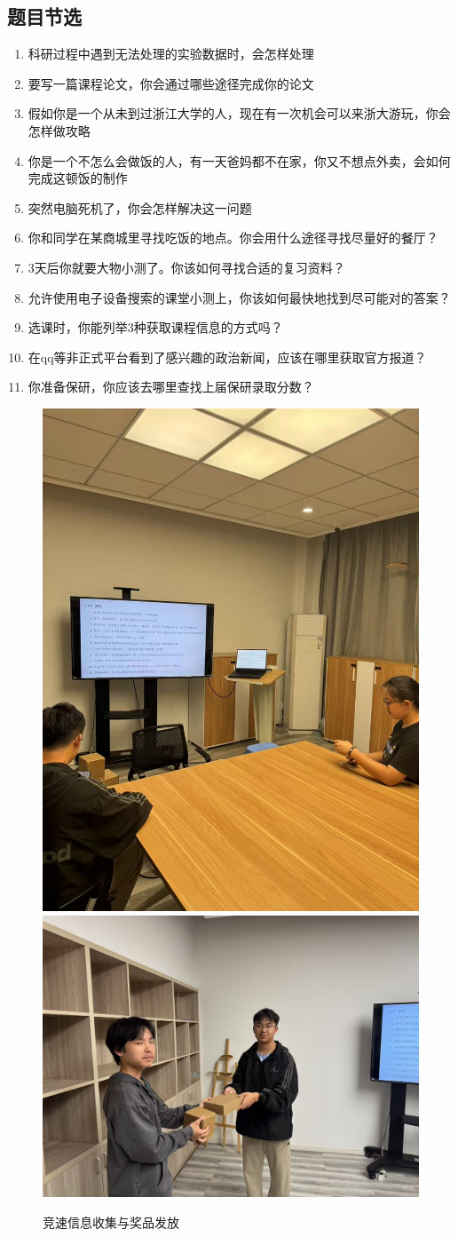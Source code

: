 \subsection{题目节选}
\begin{enumerate}
    \item 科研过程中遇到无法处理的实验数据时，会怎样处理
    \item 要写一篇课程论文，你会通过哪些途径完成你的论文
    \item 假如你是一个从未到过浙江大学的人，现在有一次机会可以来浙大游玩，你会怎样做攻略
    \item 你是一个不怎么会做饭的人，有一天爸妈都不在家，你又不想点外卖，会如何完成这顿饭的制作
    \item 突然电脑死机了，你会怎样解决这一问题
    \item 你和同学在某商城里寻找吃饭的地点。你会用什么途径寻找尽量好的餐厅？
    \item 3天后你就要大物小测了。你该如何寻找合适的复习资料？
    \item 允许使用电子设备搜索的课堂小测上，你该如何最快地找到尽可能对的答案？
    \item 选课时，你能列举3种获取课程信息的方式吗？
    \item 在qq等非正式平台看到了感兴趣的政治新闻，应该在哪里获取官方报道？
    \item 你准备保研，你应该去哪里查找上届保研录取分数？
\end{enumerate}
\begin{figure}
    \centering
    \includegraphics[width=.4\textwidth]{./figures/收集.jpg}
    \quad
    \includegraphics[width=.4\textwidth]{./figures/奖品发放.jpg}
    \caption{竞速信息收集与奖品发放}
\end{figure}

